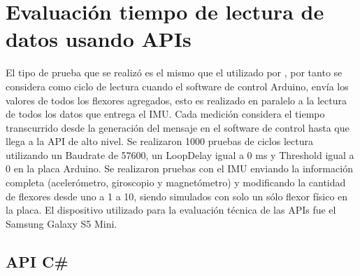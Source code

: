 \section{Evaluación tiempo de lectura de datos usando APIs}
El tipo de prueba que se realizó es el mismo que el utilizado por \cite{tesis-cerda-rodrigo}, por tanto se considera como ciclo de lectura cuando el software de control Arduino, envía los valores de todos los flexores agregados, esto es realizado en paralelo a la lectura de todos los datos que entrega el IMU. Cada medición considera el tiempo transcurrido desde la generación del mensaje en el software de control hasta que llega a la API de alto nivel. Se realizaron 1000 pruebas de ciclos lectura utilizando un Baudrate de 57600, un LoopDelay igual a 0 ms y Threshold igual a 0 en la placa Arduino. Se realizaron pruebas con el IMU enviando la información completa (acelerómetro, giroscopio y magnetómetro) y modificando la cantidad de flexores desde uno a 1 a 10, siendo simulados con solo un sólo flexor físico en la placa. El dispositivo utilizado para la evaluación técnica de las APIs fue el Samsung Galaxy S5 Mini.

\subsection{API C\#}


